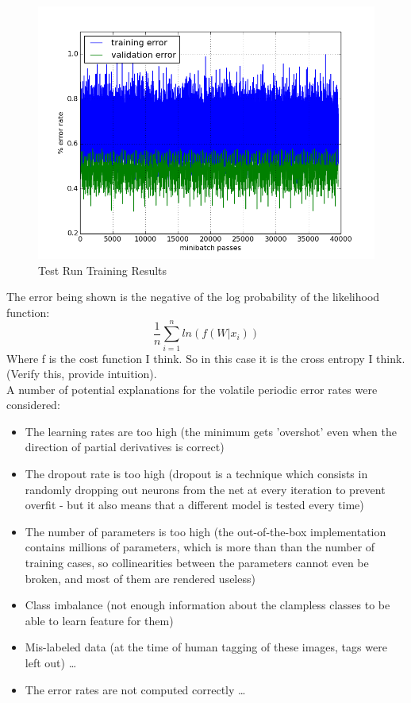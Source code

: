 \documentclass[a4paper,11pt]{article}
\begin{document}
\begin{figure}[h!]
	\centering
	\includegraphics[scale=0.5]{images/test_run.png}
	\caption{Test Run Training Results}
\end{figure}

The error being shown is the negative of the log probability of the likelihood function:
\begin{equation}
\frac{1}{n}\sum\limits_{i=1}^n ln(f(W|x_i))
\end{equation}
Where f is the cost function I think. So in this case it is the cross entropy I think. (Verify this, provide intuition).\\

A number of potential explanations for the volatile periodic error rates were considered:
\begin{itemize}
\item The learning rates are too high (the minimum gets 'overshot' even when the direction of partial derivatives is correct)
\item The dropout rate is too high (dropout is a technique which consists in randomly dropping out neurons from the net at every iteration to prevent overfit - but it also means that a different model is tested every time)
\item The number of parameters is too high (the out-of-the-box implementation contains millions of parameters, which is more than than the number of training cases, so collinearities between the parameters cannot even be broken, and most of them are rendered useless)
\item Class imbalance (not enough information about the clampless classes to be able to learn feature for them)
\item Mis-labeled data (at the time of human tagging of these images, tags were left out) \ldots
\item The error rates are not computed correctly \ldots
\end{itemize}
\end{document}

